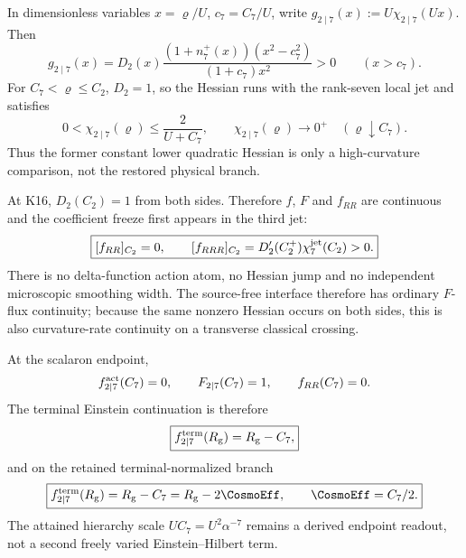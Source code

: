 \documentclass[12pt,a4paper]{article}
\begin{document}
\begin{theorem}
In dimensionless variables $x=\varrho/U$, $c_7=C_7/U$, write
$g_{2\mid7}(x):=U\chi_{2\mid7}(Ux)$.  Then
\begin{equation}
\label{p8:eq:laur27-global-convexity}
 \boxed{
 g_{2\mid7}(x)=D_2(x)
 \frac{(1+n_7^+(x))(x^2-c_7^2)}{(1+c_7)x^2}>0
 \qquad(x>c_7).}
\end{equation}
For $C_7<\varrho\le C_2$, $D_2=1$, so the Hessian runs with the rank-seven
local jet and satisfies
\[
 0<\chi_{2\mid7}(\varrho)\le\frac2{U+C_7},\qquad
 \chi_{2\mid7}(\varrho)\longrightarrow0^+
 \quad(\varrho\downarrow C_7).
\]
Thus the former constant lower quadratic Hessian is only a high-curvature
comparison, not the restored physical branch.

At K16, $D_2(C_2)=1$ from both sides.  Therefore $f$, $F$ and $f_{RR}$ are
continuous and the coefficient freeze first appears in the third jet:
\begin{equation}
\label{p8:eq:laur17-positive-obstacle-measure}
 \boxed{[f_{RR}]_{C_2}=0,\qquad
 [f_{RRR}]_{C_2}=D_2'(C_2^+)\chi_7^{\rm jet}(C_2)>0.}
\end{equation}
There is no delta-function action atom, no Hessian jump and no independent
microscopic smoothing width.  The source-free interface therefore has ordinary
$F$-flux continuity; because the same nonzero Hessian occurs on both sides,
this is also curvature-rate continuity on a transverse classical crossing.

At the scalaron endpoint,
\[
 f_{2\mid7}^{\rm act}(C_7)=0,\qquad
 F_{2\mid7}(C_7)=1,\qquad
 f_{RR}(C_7)=0.
\]
The terminal Einstein continuation is therefore
\begin{equation}
\label{p8:eq:laur17-terminal-action}
 \boxed{f_{2\mid7}^{\rm term}(R_{\rm g})=R_{\rm g}-C_7,}
\end{equation}
and on the retained terminal-normalized branch
\begin{equation}
\label{p8:eq:laur17-postfreeze-total}
 \boxed{f_{2\mid7}^{\rm term}(R_{\rm g})
 =R_{\rm g}-C_7=R_{\rm g}-2\CosmoEff,
 \qquad \CosmoEff=C_7/2.}
\end{equation}
The attained hierarchy scale $UC_7=U^2\alpha^{-7}$ remains a derived endpoint
readout, not a second freely varied Einstein--Hilbert term.
\end{theorem}
\end{document}
